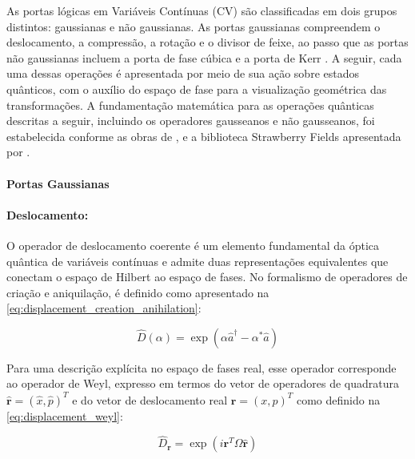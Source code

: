 As portas lógicas em Variáveis Contínuas (CV) são classificadas em dois grupos distintos: gaussianas e não gaussianas. As portas gaussianas compreendem o deslocamento, a compressão, a rotação e o divisor de feixe, ao passo que as portas não gaussianas incluem a porta de fase cúbica e a porta de Kerr \cite{fukui2022building, sharma2020characterizing, weedbrook2012gaussian, serafini_quantum_2023}. A seguir, cada uma dessas operações é apresentada por meio de sua ação sobre estados quânticos, com o auxílio do espaço de fase para a visualização geométrica das transformações. A fundamentação matemática para as operações quânticas descritas a seguir, incluindo os operadores gausseanos e não gausseanos, foi estabelecida conforme as obras de \textcite{de_lima_redes_nodate}, \textcite{serafini_quantum_2023} e a biblioteca Strawberry Fields apresentada por \textcite{killoran_strawberry_2019}.

\paragraph{Portas Gaussianas}

\paragraph*{\textbf{Deslocamento}:}

O operador de deslocamento coerente é um elemento fundamental da óptica quântica de variáveis contínuas e admite duas representações equivalentes que conectam o espaço de Hilbert ao espaço de fases. No formalismo de operadores de criação e aniquilação, é definido como apresentado na \autoref{eq:displacement_creation_anihilation}:

\begin{equation}
\label{eq:displacement_creation_anihilation}
\hat{D}(\alpha) = \exp(\alpha\hat{a}^\dagger - \alpha^*\hat{a})
\end{equation}

Para uma descrição explícita no espaço de fases real, esse operador corresponde ao operador de Weyl, expresso em termos do vetor de operadores de quadratura $\hat{\mathbf{r}}=(\hat{x},\hat{p})^T$ e do vetor de deslocamento real $\mathbf{r}=(x,p)^T$ como definido na \autoref{eq:displacement_weyl}:

\begin{equation}
\label{eq:displacement_weyl}
\hat{D}_{\mathbf{r}} = \exp(i\mathbf{r}^T \Omega \hat{\mathbf{r}})
\end{equation}

